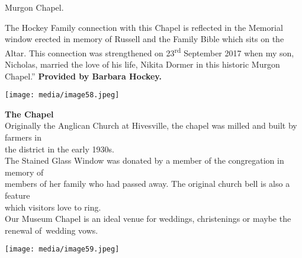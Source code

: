 Murgon Chapel.

The Hockey Family connection with this Chapel is reflected in the Memorial window erected in memory of Russell and the Family Bible which sits on the Altar. This connection was strengthened on 23\textsuperscript{rd} September 2017 when my son, Nicholas, married the love of his life, Nikita Dormer in this historic Murgon Chapel.'' \textbf{Provided by Barbara Hockey.}

\texttt{[image: media/image58.jpeg]}

\textbf{The Chapel}\\
Originally the Anglican Church at Hivesville, the chapel was milled and built by farmers in\\
the district in the early 1930s.\\
The Stained Glass Window was donated by a member of the congregation in memory of\\
members of her family who had passed away. The original church bell is also a feature\\
which visitors love to ring.\\
Our Museum Chapel is an ideal venue for weddings, christenings or maybe the renewal of~wedding vows.

\texttt{[image: media/image59.jpeg]}
